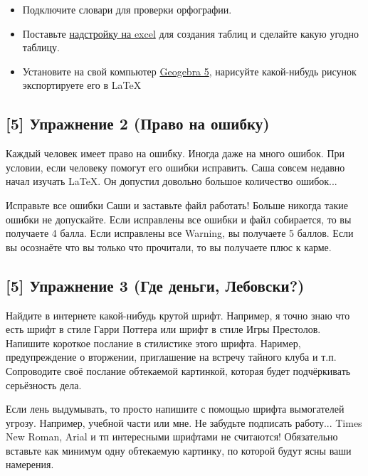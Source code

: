 \documentclass[12pt, a4paper, oneside]{article}
\begin{document}

\begin{itemize}
	\item   Подключите словари для проверки орфографии.
	\item   Поставьте \href{https://www.ctan.org/pkg/excel2latex}{надстройку на excel} для создания таблиц и сделайте какую угодно таблицу. 
	\item  Установите на свой компьютер \href{https://www.geogebra.org/download?lang=ru }{Geogebra 5}, нарисуйте какой-нибудь рисунок экспортируете его в \LaTeX 
\end{itemize}




\subsection*{[5]  Упражнение 2 (Право на ошибку)}

Каждый человек имеет право на ошибку. Иногда даже на много ошибок. При условии, если человеку помогут его ошибки исправить. Саша совсем недавно начал изучать \LaTeX{}. Он допустил довольно большое количество ошибок...

Исправьте все ошибки Саши и заставьте файл работать! Больше никогда такие ошибки не допускайте. Если исправлены все ошибки и файл собирается, то вы получаете 4 балла. Если исправлены все Warning, вы получаете 5 баллов. Если вы осознаёте что вы только что прочитали, то вы получаете плюс к карме.



\subsection*{[5]  Упражнение 3 (Где деньги, Лебовски?)}

Найдите в интернете какой-нибудь крутой шрифт.  Например, я точно знаю что есть шрифт в стиле Гарри Поттера или шрифт в стиле Игры Престолов. Напишите короткое послание в стилистике этого шрифта. Наример, предупреждение о вторжении, приглашение на встречу тайного клуба и т.п. Сопроводите своё послание обтекаемой картинкой, которая будет подчёркивать серьёзность дела. 

Если лень выдумывать, то просто напишите с помощью шрифта вымогателей угрозу.  Например, учебной части или мне.  Не забудьте подписать работу...   Times New Roman, Arial и тп интересными шрифтами не считаются!  Обязательно вставьте как минимум одну обтекаемую картинку, по которой будут ясны ваши намерения. 
\end{document}
